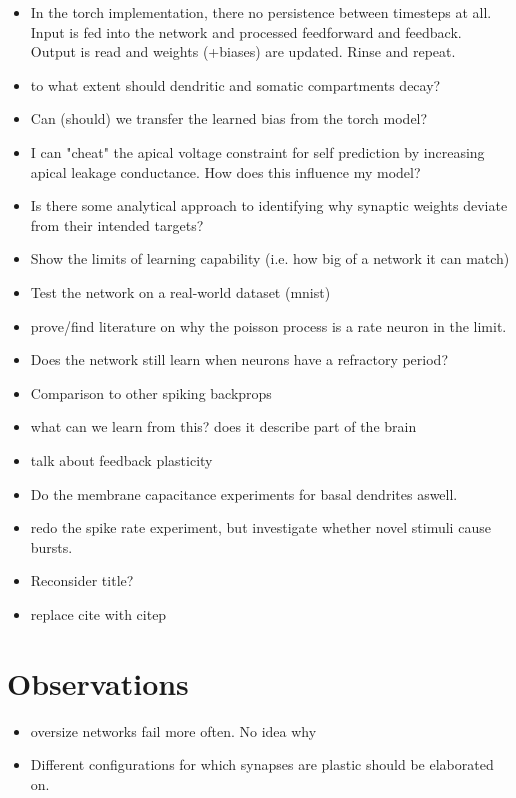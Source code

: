 \begin{itemize}
    \item In the torch implementation, there no persistence between timesteps at all. Input is fed into the network and
    processed feedforward and feedback. Output is read and weights (+biases) are updated. Rinse and repeat.
    \item to what extent should dendritic and somatic compartments decay?
    \item Can (should) we transfer the learned bias from the torch model?
    \item I can "cheat" the apical voltage constraint for self prediction by increasing apical leakage conductance. How
    does this influence my model?
    \item Is there some analytical approach to identifying why synaptic weights deviate from their intended targets?

    \item Show the limits of learning capability (i.e. how big of a network it can match)
    \item Test the network on a real-world dataset (mnist)
    \item prove/find literature on why the poisson process is a rate neuron in the limit.
    \item Does the network still learn when neurons have a refractory period?
    \item Comparison to other spiking backprops
    \item what can we learn from this? does it describe part of the brain
    \item talk about feedback plasticity
    \item Do the membrane capacitance experiments for basal dendrites aswell.
    \item redo the spike rate experiment, but investigate whether novel stimuli cause bursts.
    \item Reconsider title?
    \item replace cite with citep
\end{itemize}

\section{Observations}

\begin{itemize}
    \item oversize networks fail more often. No idea why
    \item Different configurations for which synapses are plastic should be elaborated on.
\end{itemize}


